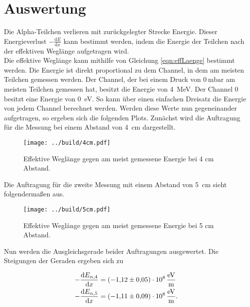 


\section{Auswertung}
\label{sec:Auswertung}

Die Alpha-Teilchen verlieren mit zurückgelegter Strecke Energie. Dieser Energieverlust $-\frac{\text{d} E}{\text{d} x}$ 
kann bestimmt werden, indem die Energie der Teilchen nach der effektiven Weglänge aufgetragen wird. \\
Die effektive Weglänge kann mithilfe von Gleichung \eqref{eqn:effLaenge} bestimmt werden.
\noindent Die Energie ist direkt proportional zu dem Channel, in dem am meisten Teilchen gemessen werden. Der Channel, der bei einem Druck von 
$\qty{0}{\milli \bar}$ am meisten Teilchen gemessen hat, besitzt die Energie von \qty{4}{\mega \eV}. Der Channel \num{0} 
besitzt eine Energie von \qty{0}{\eV}. So kann über einen einfachen Dreisatz die Energie von jedem Channel berechnet 
werden. Werden diese Werte nun gegeneinander aufgetragen, so ergeben sich die folgenden Plots.
Zunächst wird die Auftragung für die Messung bei einem Abstand von \qty{4}{\centi \meter} dargestellt.

\begin{figure}[H]
    \texttt{[image: ../build/4cm.pdf]}
    \caption{Effektive Weglänge gegen am meist gemessene Energie bei 4 cm Abstand.}
\end{figure}

\noindent Die Auftragung für die zweite Messung mit einem Abstand von \qty{5}{\centi \meter} sieht folgendermaßen aus.

\begin{figure}[H] 
    \texttt{[image: ../build/5cm.pdf]}
    \caption{Effektive Weglänge gegen am meist gemessene Energie bei 5 cm Abstand.}
\end{figure}

\noindent Nun werden die Ausgleichsgerade beider Auftragungen ausgewertet. Die Steigungen der Geraden ergeben sich zu 

\begin{align*}
    -\frac{\text{d} E_{\alpha, 4}}{\text{d} x} &= \qty{-1.12 \pm 0.05 e8}{\eV \per \meter} \\
    -\frac{\text{d} E_{\alpha, 5}}{\text{d} x} &= \qty{-1.11 \pm 0.09 e8}{\eV \per \meter}. \\
\end{align*}

